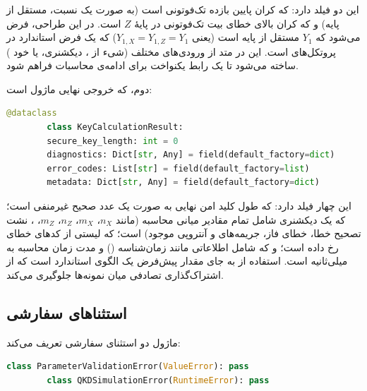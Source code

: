 این  دو فیلد دارد:  که کران پایین بازده تک‌فوتونی است (به صورت یک نسبت، مستقل از پایه) و  که کران بالای خطای بیت تک‌فوتونی در پایۀ $Z$ است. در این طراحی، فرض می‌شود که $Y_1$ مستقل از پایه است (یعنی $Y_{1,X} = Y_{1,Z} = Y_1$) که یک فرض استاندارد در پروتکل‌های  است. این  در متد  از ورودی‌های مختلف (شیء  از ، دیکشنری، یا خود ) ساخته می‌شود تا یک رابط یکنواخت برای ادامه‌ی محاسبات فراهم شود.

دوم،  که خروجی نهایی ماژول است:

\begin{LTR}
	\begin{lstlisting}[language=Python]
		@dataclass
		class KeyCalculationResult:
		secure_key_length: int = 0
		diagnostics: Dict[str, Any] = field(default_factory=dict)
		error_codes: List[str] = field(default_factory=list)
		metadata: Dict[str, Any] = field(default_factory=dict)
	\end{lstlisting}
\end{LTR}

این  چهار فیلد دارد:  که طول کلید امن نهایی به صورت یک عدد صحیح غیرمنفی است؛  که یک دیکشنری شامل تمام مقادیر میانی محاسبه (مانند $n_X$، $m_X$، $n_Z$، $m_Z$، ، نشت تصحیح خطا، خطای فاز، جریمه‌های  و آنتروپی موجود) است؛  که لیستی از کدهای خطای رخ داده است؛ و  که شامل اطلاعاتی مانند زمان‌شناسه () و مدت زمان محاسبه به میلی‌ثانیه است. استفاده از  به جای مقدار پیش‌فرض \lr{\texttt{\{\}}} یک الگوی استاندارد  است که از اشتراک‌گذاری  تصادفی میان نمونه‌ها جلوگیری می‌کند.

\subsection{استثناهای سفارشی}

ماژول دو استثنای سفارشی تعریف می‌کند:

\begin{LTR}
	\begin{lstlisting}[language=Python]
		class ParameterValidationError(ValueError): pass
		class QKDSimulationError(RuntimeError): pass
	\end{lstlisting}
\end{LTR}


